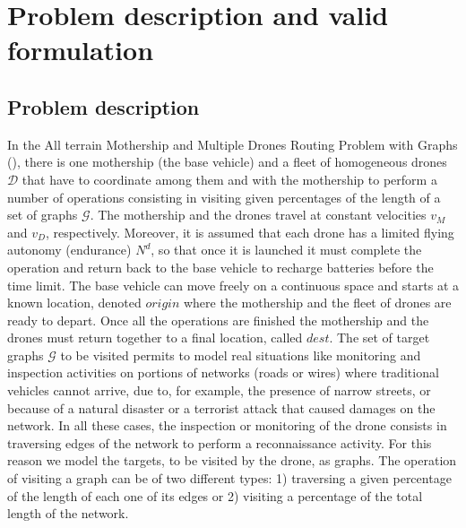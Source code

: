 \section{Problem description and valid formulation}\label{section:desc}

\subsection{Problem description}
In the All terrain Mothership and Multiple Drones Routing Problem with Graphs (\AMD), there is one mothership (the base vehicle) and a fleet of homogeneous drones $\mathcal D$ that have to coordinate among them and with the mothership to perform a number of operations consisting in visiting given percentages of the length of a set of graphs $\mathcal G$. The mothership and the drones travel at constant velocities $v_M$ and $v_D$, respectively. Moreover, it is assumed that each  drone has a limited flying autonomy (endurance) $N^d$, so that once it is launched it must complete the operation and return back to the base vehicle to recharge batteries before the time limit. The base vehicle can move freely on a continuous space and starts at a known location, denoted $origin$ where the mothership and the fleet of drones are ready to depart. Once all the operations are finished the mothership and the drones must return together to a final location, called $dest$. 
\noindent
The set of target graphs $\mathcal G$ to be visited  permits to model real situations like monitoring and inspection activities on portions of networks (roads or wires) where traditional vehicles cannot arrive, due to, for example,  the presence of narrow streets, or because of a natural disaster or a terrorist attack that caused damages on the network. In all these cases, the inspection or monitoring of the drone consists in traversing edges of the network to perform a reconnaissance activity. For this reason we model the targets, to be visited by the drone, as graphs. The operation of visiting a graph can be of two different types: 1) traversing a given percentage of the length of each one of its edges or 2) visiting a percentage of the total length of the network. 


